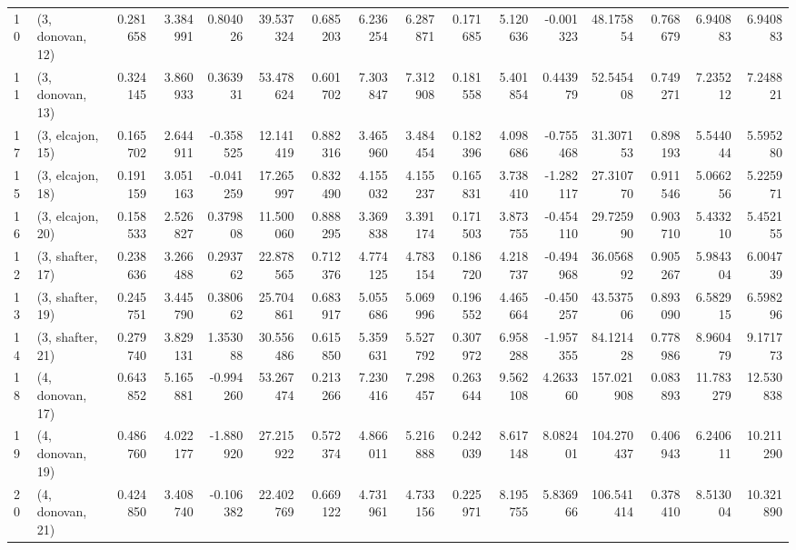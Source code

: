 \begin{tabular}{llrrrrrrrrrrrrrr}
10 &  (3, donovan, 12) &   0.281658 &  3.384991 &  0.804026 &  39.537324 &  0.685203 &   6.236254 &  6.287871 &  0.171685 &  5.120636 & -0.001323 &   48.175854 &  0.768679 &   6.940883 &   6.940883 \\
11 &  (3, donovan, 13) &   0.324145 &  3.860933 &  0.363931 &  53.478624 &  0.601702 &   7.303847 &  7.312908 &  0.181558 &  5.401854 &  0.443979 &   52.545408 &  0.749271 &   7.235212 &   7.248821 \\
17 &  (3, elcajon, 15) &   0.165702 &  2.644911 & -0.358525 &  12.141419 &  0.882316 &   3.465960 &  3.484454 &  0.182396 &  4.098686 & -0.755468 &   31.307153 &  0.898193 &   5.544044 &   5.595280 \\
15 &  (3, elcajon, 18) &   0.191159 &  3.051163 & -0.041259 &  17.265997 &  0.832490 &   4.155032 &  4.155237 &  0.165831 &  3.738410 & -1.282117 &   27.310770 &  0.911546 &   5.066256 &   5.225971 \\
16 &  (3, elcajon, 20) &   0.158533 &  2.526827 &  0.379808 &  11.500060 &  0.888295 &   3.369838 &  3.391174 &  0.171503 &  3.873755 & -0.454110 &   29.725990 &  0.903710 &   5.433210 &   5.452155 \\
12 &  (3, shafter, 17) &   0.238636 &  3.266488 &  0.293762 &  22.878565 &  0.712376 &   4.774125 &  4.783154 &  0.186720 &  4.218737 & -0.494968 &   36.056892 &  0.905267 &   5.984304 &   6.004739 \\
13 &  (3, shafter, 19) &   0.245751 &  3.445790 &  0.380662 &  25.704861 &  0.683917 &   5.055686 &  5.069996 &  0.196552 &  4.465664 & -0.450257 &   43.537506 &  0.893090 &   6.582915 &   6.598296 \\
14 &  (3, shafter, 21) &   0.279740 &  3.829131 &  1.353088 &  30.556486 &  0.615850 &   5.359631 &  5.527792 &  0.307972 &  6.958288 & -1.957355 &   84.121428 &  0.778986 &   8.960479 &   9.171773 \\
18 &  (4, donovan, 17) &   0.643852 &  5.165881 & -0.994260 &  53.267474 &  0.213266 &   7.230416 &  7.298457 &  0.263644 &  9.562108 &  4.263360 &  157.021908 &  0.083893 &  11.783279 &  12.530838 \\
19 &  (4, donovan, 19) &   0.486760 &  4.022177 & -1.880920 &  27.215922 &  0.572374 &   4.866011 &  5.216888 &  0.242039 &  8.617148 &  8.082401 &  104.270437 &  0.406943 &   6.240611 &  10.211290 \\
20 &  (4, donovan, 21) &   0.424850 &  3.408740 & -0.106382 &  22.402769 &  0.669122 &   4.731961 &  4.733156 &  0.225971 &  8.195755 &  5.836966 &  106.541414 &  0.378410 &   8.513004 &  10.321890 \\

\end{tabular}
